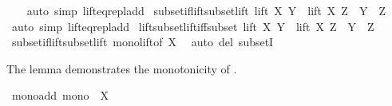 \begin{isabellebody}
%
\isadelimproof
\ \ %
\endisadelimproof
%
\isatagproof
{}\isamarkupfalse%
\ {\isacharparenleft}{\kern0pt}auto\ simp{\isacharcolon}{\kern0pt}\ lift{\isacharunderscore}{\kern0pt}eq{\isacharunderscore}{\kern0pt}repl{\isacharunderscore}{\kern0pt}add{\isacharparenright}{\kern0pt}%
\endisatagproof
{\isafoldproof}%
%
\isadelimproof
\isanewline
%
\endisadelimproof
\isanewline
{}\isamarkupfalse%
\ subset{\isacharunderscore}{\kern0pt}if{\isacharunderscore}{\kern0pt}lift{\isacharunderscore}{\kern0pt}subset{\isacharunderscore}{\kern0pt}lift{\isacharcolon}{\kern0pt}\ {\isachardoublequoteopen}lift\ X\ Y\ {\isasymsubseteq}\ lift\ X\ Z\ {\isasymLongrightarrow}\ Y\ {\isasymsubseteq}\ Z{\isachardoublequoteclose}\isanewline
%
\isadelimproof
\ \ %
\endisadelimproof
%
\isatagproof
{}\isamarkupfalse%
\ {\isacharparenleft}{\kern0pt}auto\ simp{\isacharcolon}{\kern0pt}\ lift{\isacharunderscore}{\kern0pt}eq{\isacharunderscore}{\kern0pt}repl{\isacharunderscore}{\kern0pt}add{\isacharparenright}{\kern0pt}%
\endisatagproof
{\isafoldproof}%
%
\isadelimproof
\isanewline
%
\endisadelimproof
\isanewline
{}\isamarkupfalse%
\ lift{\isacharunderscore}{\kern0pt}subset{\isacharunderscore}{\kern0pt}lift{\isacharunderscore}{\kern0pt}iff{\isacharunderscore}{\kern0pt}subset{\isacharcolon}{\kern0pt}\ {\isachardoublequoteopen}lift\ X\ Y\ {\isasymsubseteq}\ lift\ X\ Z\ {\isasymlongleftrightarrow}\ Y\ {\isasymsubseteq}\ Z{\isachardoublequoteclose}\isanewline
%
\isadelimproof
\ \ %
\endisadelimproof
%
\isatagproof
{}\isamarkupfalse%
\ subset{\isacharunderscore}{\kern0pt}if{\isacharunderscore}{\kern0pt}lift{\isacharunderscore}{\kern0pt}subset{\isacharunderscore}{\kern0pt}lift\ mono{\isacharunderscore}{\kern0pt}lift{\isacharbrackleft}{\kern0pt}of\ X{\isacharbrackright}{\kern0pt}\ \isamarkupfalse%
\ {\isacharparenleft}{\kern0pt}auto\ del{\isacharcolon}{\kern0pt}\ subsetI{\isacharparenright}{\kern0pt}%
\endisatagproof
{\isafoldproof}%
%
\isadelimproof
%
\endisadelimproof
%
\begin{isamarkuptext}%
The lemma demonstrates the monotonicity of \isa{{\isacharparenleft}{\kern0pt}{\isacharplus}{\kern0pt}{\isacharparenright}{\kern0pt}} .%
\end{isamarkuptext}\isamarkuptrue%
\isamarkupfalse%
\ mono{\isacharunderscore}{\kern0pt}add{\isacharcolon}{\kern0pt}\ {\isachardoublequoteopen}mono\ {\isacharparenleft}{\kern0pt}{\isacharparenleft}{\kern0pt}{\isacharplus}{\kern0pt}{\isacharparenright}{\kern0pt}\ X{\isacharparenright}{\kern0pt}{\isachardoublequoteclose}\isanewline

\end{isabellebody}
